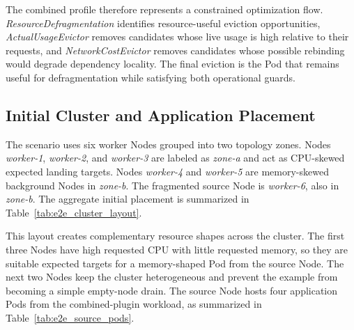 The combined profile therefore represents a constrained optimization flow. \textit{ResourceDefragmentation} identifies resource-useful eviction opportunities, \textit{ActualUsageEvictor} removes candidates whose live usage is high relative to their requests, and \textit{NetworkCostEvictor} removes candidates whose possible rebinding would degrade dependency locality. The final eviction is the Pod that remains useful for defragmentation while satisfying both operational guards.

\subsection{Initial Cluster and Application Placement}

The scenario uses six worker Nodes grouped into two topology zones. Nodes \textit{worker-1}, \textit{worker-2}, and \textit{worker-3} are labeled as \textit{zone-a} and act as CPU-skewed expected landing targets. Nodes \textit{worker-4} and \textit{worker-5} are memory-skewed background Nodes in \textit{zone-b}. The fragmented source Node is \textit{worker-6}, also in \textit{zone-b}. The aggregate initial placement is summarized in Table~\ref{tab:e2e_cluster_layout}.

\begin{table}[H]
    \centering
    \caption{End-to-End Use Case: Aggregate Initial Cluster Placement}
    \label{tab:e2e_cluster_layout}
    \renewcommand{\arraystretch}{1.2}
\end{table}

This layout creates complementary resource shapes across the cluster. The first three Nodes have high requested CPU with little requested memory, so they are suitable expected targets for a memory-shaped Pod from the source Node. The next two Nodes keep the cluster heterogeneous and prevent the example from becoming a simple empty-node drain. The source Node hosts four application Pods from the combined-plugin workload, as summarized in Table~\ref{tab:e2e_source_pods}.

